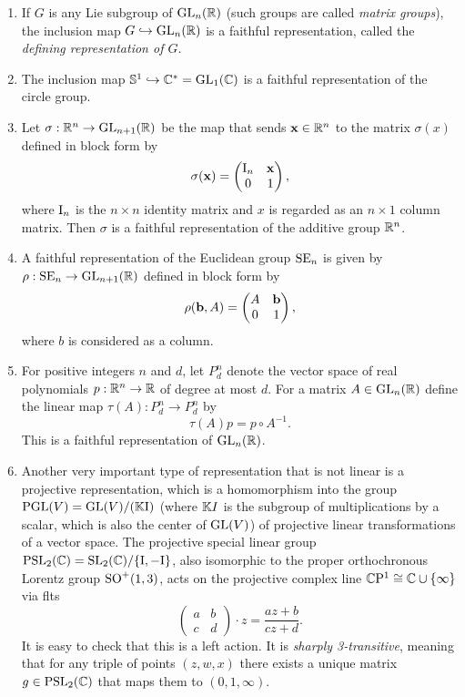 \begin{example}\label{ex Lie group representations}
    \begin{enumerate}[label=(\alph*)]
        \item If $G$ is any Lie subgroup of $\GL_n(\bbR)$ (such groups are called \emph{matrix groups}), the inclusion map $G\hookrightarrow \GL_n(\bbR)$ is a faithful representation, called the \emph{defining representation of $G$}.
        \item The inclusion map $\bbS^1\hookrightarrow\bbC^\ast=\GL_1(\bbC)$ is a faithful representation of the circle group.
        \item Let $\sigma:\bbR^n\to \GL_{n+1}(\bbR)$ be the map that sends $\bf{x}\in\bbR^n$ to the matrix $\sigma(x)$ defined in block form by 
        \[\sigma(\bf{x})=\begin{pmatrix}
            \rmI_n & \bf{x}\\
            0 & 1
        \end{pmatrix},\]
        where $\rmI_n$ is the $n\times n$ identity matrix and $x$ is regarded as an $n\times 1$  column matrix. Then $\sigma$ is a faithful representation of the additive group $\bbR^n$.
        \item A faithful representation of the Euclidean group $\SE_n$ is given by $\rho:\SE_n\to \GL_{n+1}(\bbR)$ defined in block form by
        \[\rho(\bf{b},A)=\begin{pmatrix}
            A & \bf{b}\\
            0 & 1
        \end{pmatrix},
        \]
        where $b$ is considered as a column.
        \item For positive integers $n$ and $d$, let $P^n_d$ denote the vector space of real polynomials $p:\bbR^n\to \bbR$ of degree at most $d$. For a matrix $A\in\GL_n(\bbR)$ define the linear map $\tau(A):P^n_d\to P^n_d$ by
        \[\tau(A)p=p\circ A^{-1}.\]
        This is a faithful representation of $\GL_n(\bbR)$.

        \item Another very important type of representation that is not linear is a projective representation, which is a homomorphism into the group $\PGL(V)=\GL(V)\slash (\bbK \rmI)$ (where $\bbK I$ is the subgroup of multiplications by a scalar, which is also the center of $\GL(V)$) of projective linear transformations of a vector space. The projective special linear group $\PSL_2(\bbC)=\SL_2(\bbC)\slash\{\rmI,-\rmI\}$, also isomorphic to the proper orthochronous Lorentz group $\SO^+(1,3)$, acts on the projective complex line $\CP^1\cong \bbC\cup\{\infty\}$ via \glspl{flt}
        \[\begin{pmatrix}
            a & b\\
            c& d
        \end{pmatrix} \cdot z=\frac{az+b}{cz+d}.\]
        It is easy to check that this is a left action. It is \emph{sharply 3-transitive}, meaning that for any triple of points $(z,w,x)$ there exists a unique matrix $g\in \PSL_2(\bbC)$ that maps them to $(0,1,\infty)$.
    \end{enumerate}
\end{example}

